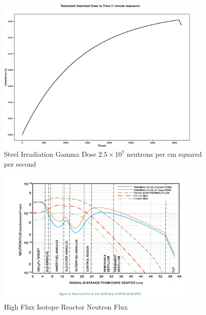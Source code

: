 \begin{figure}
  \begin{center}
    \includegraphics[width=10.0cm]{chapters/consequences_of_ionizing_radiation/neutron_plots/1/gamma_dose.eps}
    \caption{Steel Irradiation Gamma Dose $2.5 \times 10^7$ neutrons per cm squared per second}
    \label{fig:neutron_irradiated_steel_dose1}
  \end{center}
\end{figure}


\begin{figure}
  \begin{center}
    \includegraphics[width=10.0cm]{chapters/consequences_of_ionizing_radiation/images/HFIR_neutron_spectra_guide.png}
    \caption{High Flux Isotope Reactor Neutron Flux}
    \label{fig:hfir_neutron_flux}
  \end{center}
\end{figure}


